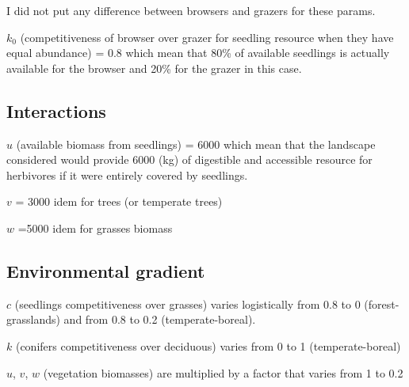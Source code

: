 \noindent I did not put any difference between browsers and grazers for these params.


\noindent $k_0$ (competitiveness of browser over grazer for seedling resource when they have equal abundance) = 0.8 which mean that 80\% of available seedlings is actually available for the browser and 20\% for the grazer in this case.

\subsection*{Interactions}

\noindent $u$ (available biomass from seedlings) = 6000 which mean that the landscape considered would provide 6000 (kg) of digestible and accessible resource for herbivores if it were entirely covered by seedlings.

\noindent $v$ = 3000 idem for trees (or temperate trees)

\noindent $w$ =5000 idem for grasses biomass 

\subsection*{Environmental gradient}

$c$ (seedlings competitiveness over grasses) varies logistically from 0.8 to 0 (forest-grasslands) and from 0.8 to 0.2 (temperate-boreal).

\noindent $k$ (conifers competitiveness over deciduous) varies from 0 to 1 (temperate-boreal)

\noindent $u$, $v$, $w$ (vegetation biomasses) are multiplied by a factor that varies from 1 to 0.2

